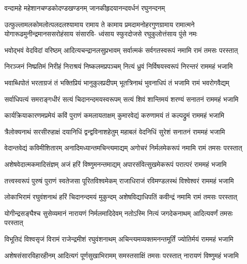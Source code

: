 \twolineshloka
{वन्दामहे महेशानचण्डकोदण्डखण्डनम्}
{जानकीहृदयानन्दवर्धनं रघुनन्दनम्}%

\fourlineindentedshloka
{उत्फुल्लामलकोमलोत्पलदलश्यामाय रामाय ते}
{कामाय प्रमदामनोहरगुणग्रामाय रामात्मने}
{योगारूढमुनीन्द्रमानससरोहंसाय संसारवि-}
{ध्वंसाय स्फुरदोजसे रघुकुलोत्तंसाय पुंसे नमः}%

\fourlineindentedshloka
{भवोद्भवं वेदविदां वरिष्ठम्}
{आदित्यचन्द्रानलसुप्रभावम्}
{सर्वात्मकं सर्वगतस्वरूपं}
{नमामि रामं तमसः परस्तात्}%

\fourlineindentedshloka
{निरञ्जनं निष्प्रतिमं निरीहं}
{निराश्रयं निष्कलमप्रपञ्चम्}
{नित्यं ध्रुवं निर्विषयस्वरूपं}
{निरन्तरं राममहं भजामि}%

\fourlineindentedshloka
{भवाब्धिपोतं भरताग्रजं तं}
{भक्तिप्रियं भानुकुलप्रदीपम्}
{भूतत्रिनाथं भुवनाधिपं तं}
{भजामि रामं भवरोगवैद्यम्}%

\fourlineindentedshloka
{सर्वाधिपत्यं समराङ्गधीरं}
{सत्यं चिदानन्दमयस्वरूपम्}
{सत्यं शिवं शान्तिमयं शरण्यं}
{सनातनं राममहं भजामि}%

\fourlineindentedshloka
{कार्यक्रियाकारणमप्रमेयं}
{कविं पुराणं कमलायताक्षम्}
{कुमारवेद्यं करुणामयं तं}
{कल्पद्रुमं राममहं भजामि}%

\fourlineindentedshloka
{त्रैलोक्यनाथं सरसीरुहाक्षं}
{दयानिधिं द्वन्द्वविनाशहेतुम्}
{महाबलं वेदनिधिं सुरेशं}
{सनातनं राममहं भजामि}%

\fourlineindentedshloka
{वेदान्तवेद्यं कविमीशितारम्}
{अनादिमध्यान्तमचिन्त्यमाद्यम्}
{अगोचरं निर्मलमेकरूपं}
{नमामि रामं तमसः परस्तात्}%

\fourlineindentedshloka
{अशेषवेदात्मकमादिसंज्ञम्}
{अजं हरिं विष्णुमनन्तमाद्यम्}
{अपारसंवित्सुखमेकरूपं}
{परात्परं राममहं भजामि}%

\fourlineindentedshloka
{तत्त्वस्वरूपं पुरुषं पुराणं}
{स्वतेजसा पूरितविश्वमेकम्}
{राजाधिराजं रविमण्डलस्थं}
{विश्वेश्वरं राममहं भजामि}%

\fourlineindentedshloka
{लोकाभिरामं रघुवंशनाथं}
{हरिं चिदानन्दमयं मुकुन्दम्}
{अशेषविद्याधिपतिं कवीन्द्रं}
{नमामि रामं तमसः परस्तात्}%

\fourlineindentedshloka
{योगीन्द्रसङ्घैश्च सुसेव्यमानं}
{नारायणं निर्मलमादिदेवम्}
{नतोऽस्मि नित्यं जगदेकनाथम्}
{आदित्यवर्णं तमसः परस्तात्}%

\fourlineindentedshloka
{विभूतिदं विश्वसृजं विरामं}
{राजेन्द्रमीशं रघुवंशनाथम्}
{अचिन्त्यमव्यक्तमनन्तमूर्तिं}
{ज्योतिर्मयं राममहं भजामि}%

\fourlineindentedshloka
{अशेषसंसारविहारहीनम्}
{आदित्यगं पूर्णसुखाभिरामम्}
{समस्तसाक्षिं तमसः परस्तात्}
{नारायणं विष्णुमहं भजामि}%

